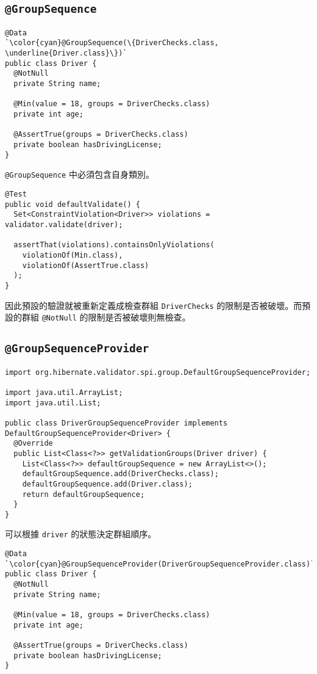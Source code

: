 \subsection{\texttt{@GroupSequence}}

\begin{lstlisting}
@Data
`\color{cyan}@GroupSequence(\{DriverChecks.class, \underline{Driver.class}\})`
public class Driver {
  @NotNull
  private String name;

  @Min(value = 18, groups = DriverChecks.class)
  private int age;

  @AssertTrue(groups = DriverChecks.class)
  private boolean hasDrivingLicense;
}
\end{lstlisting}

\texttt{@GroupSequence} 中必須包含自身類別。

\begin{lstlisting}
@Test
public void defaultValidate() {
  Set<ConstraintViolation<Driver>> violations = validator.validate(driver);

  assertThat(violations).containsOnlyViolations(
    violationOf(Min.class),
    violationOf(AssertTrue.class)
  );
}
\end{lstlisting}

因此預設的驗證就被重新定義成檢查群組 \texttt{DriverChecks} 的限制是否被破壞。而預設的群組 \texttt{@NotNull} 的限制是否被破壞則無檢查。

\subsection{\texttt{@GroupSequenceProvider}}

\begin{lstlisting}
import org.hibernate.validator.spi.group.DefaultGroupSequenceProvider;

import java.util.ArrayList;
import java.util.List;

public class DriverGroupSequenceProvider implements DefaultGroupSequenceProvider<Driver> {
  @Override
  public List<Class<?>> getValidationGroups(Driver driver) {
    List<Class<?>> defaultGroupSequence = new ArrayList<>();
    defaultGroupSequence.add(DriverChecks.class);
    defaultGroupSequence.add(Driver.class);
    return defaultGroupSequence;
  }
}

\end{lstlisting}

可以根據 \texttt{driver} 的狀態決定群組順序。

\begin{lstlisting}
@Data
`\color{cyan}@GroupSequenceProvider(DriverGroupSequenceProvider.class)`
public class Driver {
  @NotNull
  private String name;

  @Min(value = 18, groups = DriverChecks.class)
  private int age;

  @AssertTrue(groups = DriverChecks.class)
  private boolean hasDrivingLicense;
}
\end{lstlisting}

